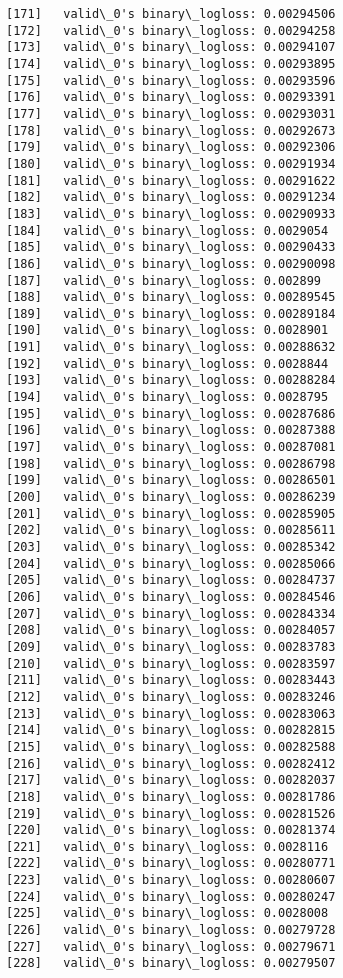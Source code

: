 \documentclass[11pt]{article}
\begin{document}
\begin{Verbatim}[commandchars=\\\{\}]
[171]	valid\_0's binary\_logloss: 0.00294506
[172]	valid\_0's binary\_logloss: 0.00294258
[173]	valid\_0's binary\_logloss: 0.00294107
[174]	valid\_0's binary\_logloss: 0.00293895
[175]	valid\_0's binary\_logloss: 0.00293596
[176]	valid\_0's binary\_logloss: 0.00293391
[177]	valid\_0's binary\_logloss: 0.00293031
[178]	valid\_0's binary\_logloss: 0.00292673
[179]	valid\_0's binary\_logloss: 0.00292306
[180]	valid\_0's binary\_logloss: 0.00291934
[181]	valid\_0's binary\_logloss: 0.00291622
[182]	valid\_0's binary\_logloss: 0.00291234
[183]	valid\_0's binary\_logloss: 0.00290933
[184]	valid\_0's binary\_logloss: 0.0029054
[185]	valid\_0's binary\_logloss: 0.00290433
[186]	valid\_0's binary\_logloss: 0.00290098
[187]	valid\_0's binary\_logloss: 0.002899
[188]	valid\_0's binary\_logloss: 0.00289545
[189]	valid\_0's binary\_logloss: 0.00289184
[190]	valid\_0's binary\_logloss: 0.0028901
[191]	valid\_0's binary\_logloss: 0.00288632
[192]	valid\_0's binary\_logloss: 0.0028844
[193]	valid\_0's binary\_logloss: 0.00288284
[194]	valid\_0's binary\_logloss: 0.0028795
[195]	valid\_0's binary\_logloss: 0.00287686
[196]	valid\_0's binary\_logloss: 0.00287388
[197]	valid\_0's binary\_logloss: 0.00287081
[198]	valid\_0's binary\_logloss: 0.00286798
[199]	valid\_0's binary\_logloss: 0.00286501
[200]	valid\_0's binary\_logloss: 0.00286239
[201]	valid\_0's binary\_logloss: 0.00285905
[202]	valid\_0's binary\_logloss: 0.00285611
[203]	valid\_0's binary\_logloss: 0.00285342
[204]	valid\_0's binary\_logloss: 0.00285066
[205]	valid\_0's binary\_logloss: 0.00284737
[206]	valid\_0's binary\_logloss: 0.00284546
[207]	valid\_0's binary\_logloss: 0.00284334
[208]	valid\_0's binary\_logloss: 0.00284057
[209]	valid\_0's binary\_logloss: 0.00283783
[210]	valid\_0's binary\_logloss: 0.00283597
[211]	valid\_0's binary\_logloss: 0.00283443
[212]	valid\_0's binary\_logloss: 0.00283246
[213]	valid\_0's binary\_logloss: 0.00283063
[214]	valid\_0's binary\_logloss: 0.00282815
[215]	valid\_0's binary\_logloss: 0.00282588
[216]	valid\_0's binary\_logloss: 0.00282412
[217]	valid\_0's binary\_logloss: 0.00282037
[218]	valid\_0's binary\_logloss: 0.00281786
[219]	valid\_0's binary\_logloss: 0.00281526
[220]	valid\_0's binary\_logloss: 0.00281374
[221]	valid\_0's binary\_logloss: 0.0028116
[222]	valid\_0's binary\_logloss: 0.00280771
[223]	valid\_0's binary\_logloss: 0.00280607
[224]	valid\_0's binary\_logloss: 0.00280247
[225]	valid\_0's binary\_logloss: 0.0028008
[226]	valid\_0's binary\_logloss: 0.00279728
[227]	valid\_0's binary\_logloss: 0.00279671
[228]	valid\_0's binary\_logloss: 0.00279507

\end{Verbatim}
\end{document}
